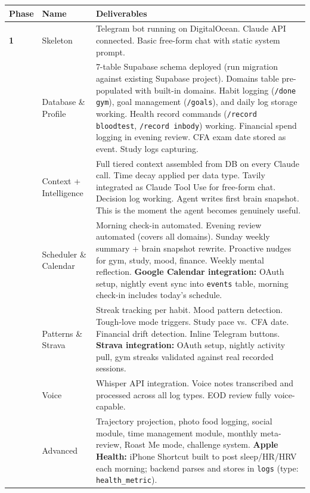 \documentclass[12pt, a4paper]{article}
\begin{document}
\begin{longtable}{>{\bfseries}p{1.5cm} p{3.5cm} p{9cm}}
\toprule
Phase & Name & Deliverables \\
\midrule
1 & Skeleton & Telegram bot running on DigitalOcean. Claude API connected. Basic free-form chat with static system prompt. \\
\addlinespace
2 & Database \& Profile & 7-table Supabase schema deployed (run migration against existing Supabase project). Domains table pre-populated with built-in domains. Habit logging (\texttt{/done gym}), goal management (\texttt{/goals}), and daily log storage working. Health record commands (\texttt{/record bloodtest}, \texttt{/record inbody}) working. Financial spend logging in evening review. CFA exam date stored as event. Study logs capturing. \\
\addlinespace
3 & Context + Intelligence & Full tiered context assembled from DB on every Claude call. Time decay applied per data type. Tavily integrated as Claude Tool Use for free-form chat. Decision log working. Agent writes first brain snapshot. This is the moment the agent becomes genuinely useful. \\
\addlinespace
4 & Scheduler \& Calendar & Morning check-in automated. Evening review automated (covers all domains). Sunday weekly summary + brain snapshot rewrite. Proactive nudges for gym, study, mood, finance. Weekly mental reflection. \textbf{Google Calendar integration:} OAuth setup, nightly event sync into \texttt{events} table, morning check-in includes today's schedule. \\
\addlinespace
5 & Patterns \& Strava & Streak tracking per habit. Mood pattern detection. Tough-love mode triggers. Study pace vs.\ CFA date. Financial drift detection. Inline Telegram buttons. \textbf{Strava integration:} OAuth setup, nightly activity pull, gym streaks validated against real recorded sessions. \\
\addlinespace
6 & Voice & Whisper API integration. Voice notes transcribed and processed across all log types. EOD review fully voice-capable. \\
\addlinespace
7 & Advanced & Trajectory projection, photo food logging, social module, time management module, monthly meta-review, Roast Me mode, challenge system. \textbf{Apple Health:} iPhone Shortcut built to post sleep/HR/HRV each morning; backend parses and stores in \texttt{logs} (type: \texttt{health\_metric}). \\
\bottomrule
\end{longtable}
\end{document}
